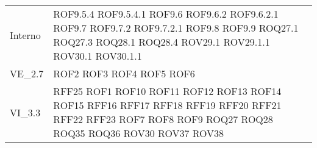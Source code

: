 \begin{longtable}{p{2.5cm}!{\VRule[1pt]}p{2.5cm}}
	Interno & ROF9.5.4 \newline ROF9.5.4.1 \newline ROF9.6 \newline ROF9.6.2 \newline ROF9.6.2.1 \newline ROF9.7 \newline ROF9.7.2 \newline ROF9.7.2.1 \newline ROF9.8 \newline ROF9.9 \newline ROQ27.1 \newline ROQ27.3 \newline ROQ28.1 \newline ROQ28.4 \newline ROV29.1 \newline ROV29.1.1 \newline ROV30.1 \newline ROV30.1.1 \\
	VE_2.7 & ROF2 \newline ROF3 \newline ROF4 \newline ROF5 \newline ROF6\\
	VI_3.3 & RFF25 \newline ROF1 \newline ROF10 \newline ROF11 \newline ROF12 \newline ROF13 \newline ROF14 \newline ROF15 \newline RFF16 \newline RFF17 \newline RFF18 \newline RFF19 \newline RFF20 \newline RFF21 \newline RFF22 \newline RFF23 \newline ROF7 \newline ROF8 \newline ROF9 \newline ROQ27 \newline ROQ28 \newline ROQ35 \newline ROQ36 \newline ROV30 \newline ROV37 \newline ROV38\\

\end{longtable}
